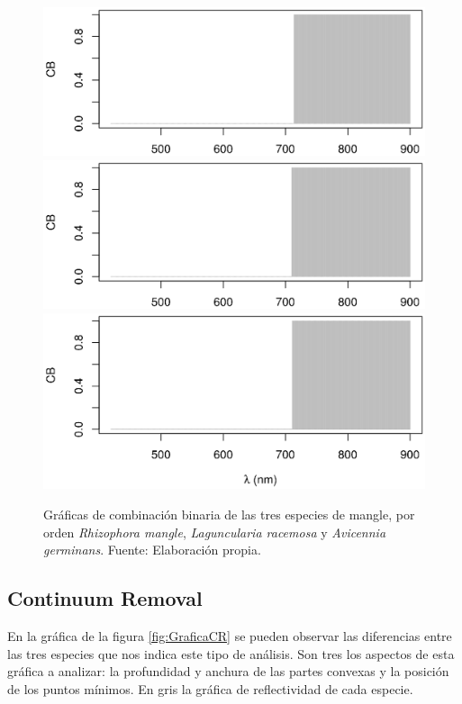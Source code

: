 \begin{figure}
	\centering
	\includegraphics[width=0.8\linewidth]{./Imagenes/IAE_RM.eps}
	\includegraphics[width=0.8\linewidth]{./Imagenes/IAE_LR.eps}
	\includegraphics[width=0.8\linewidth]{./Imagenes/IAE_AG.eps}
	\caption[Gráficas de combinación binaria]{Gráficas de combinación binaria de las tres especies de mangle, por orden \textit{Rhizophora mangle}, \textit{Laguncularia racemosa} y \textit{Avicennia germinans}. Fuente: Elaboración propia.}
	\label{fig:CB}
\end{figure}

\subsection{Continuum Removal}
En la gráfica de la figura \ref{fig:GraficaCR} se pueden observar las diferencias entre las tres especies que nos indica este tipo de análisis. Son tres los aspectos de esta gráfica a analizar: la profundidad y anchura de las partes convexas y la posición de los puntos mínimos. En gris la gráfica de reflectividad de cada especie.\Sep


